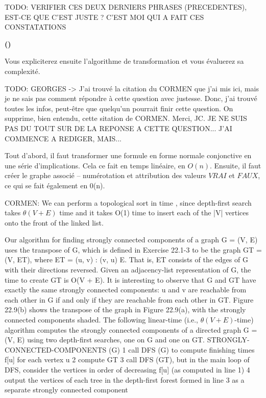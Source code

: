 \documentclass{article}
\newcounter{enoncecount}
\newcounter{sousenoncecount}
\newenvironment{sousenonce}
{
\stepcounter{sousenoncecount}
\bf\small (\alph{sousenoncecount})
\begin{bf}
}
{
\end{bf}
}
\begin{document}
TODO: VERIFIER CES DEUX DERNIERS PHRASES (PRECEDENTES), EST-CE QUE C'EST JUSTE ? C'EST MOI QUI A FAIT CES CONSTATATIONS 

\begin{sousenonce}
Vous expliciterez ensuite l'algorithme de transformation et vous évaluerez sa complexité.
\end{sousenonce}

TODO: GEORGES -> J'ai trouvé la citation du CORMEN que j'ai mis ici, mais je ne sais pas comment répondre à cette question avec justesse. Donc, j'ai trouvé toutes les infos, peut-être que quelqu'un pourrait finir cette question. On supprime, bien entendu, cette sitation de CORMEN. Merci, JC.
JE NE SUIS PAS DU TOUT SUR DE LA REPONSE A CETTE QUESTION... J'AI COMMENCE A REDIGER, MAIS...

Tout d'abord, il faut transformer une formule en forme normale conjonctive en une série d'implications. Cela ce fait en temps linéaire, en $O(n)$. Ensuite, il faut créer le graphe associé -- numérotation et attribution des valeurs $VRAI$ et $FAUX$, ce qui se fait également en 0(n). 


CORMEN:
We can perform a topological sort in time , since depth-first search takes $\theta(V + E)$
time and it takes O(1) time to insert each of the |V| vertices onto the front of the linked list.


Our algorithm for finding strongly connected components of a graph G = (V, E) uses the
transpose of G, which is defined in Exercise 22.1-3 to be the graph GT = (V, ET), where ET =
{(u, v) : (v, u) E}. That is, ET consists of the edges of G with their directions reversed. Given
an adjacency-list representation of G, the time to create GT is O(V + E). It is interesting to
observe that G and GT have exactly the same strongly connected components: u and v are
reachable from each other in G if and only if they are reachable from each other in GT. Figure
22.9(b) shows the transpose of the graph in Figure 22.9(a), with the strongly connected
components shaded.
The following linear-time (i.e., $\theta(V + E)$-time) algorithm computes the strongly connected
components of a directed graph G = (V, E) using two depth-first searches, one on G and one
on GT.
STRONGLY-CONNECTED-COMPONENTS (G)
1 call DFS (G) to compute finishing times f[u] for each vertex u
2 compute GT
3 call DFS (GT), but in the main loop of DFS, consider the vertices
in order of decreasing f[u] (as computed in line 1)
4 output the vertices of each tree in the depth-first forest formed in
line 3 as a
separate strongly connected component
\end{document}
